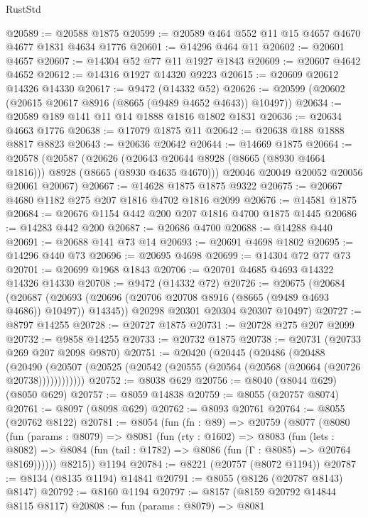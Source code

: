 \begin{lexlean}{RustStd}
\begin{coremodule}
@20589 := @20588 @1875
@20599 := @20589 @464 @552 @11 @15 @4657 @4670 @4677 @1831 @4634 @1776
@20601 := @14296 @464 @11
@20602 := @20601 @4657
@20607 := @14304 @52 @77 @11 @1927 @1843
@20609 := @20607 @4642 @4652
@20612 := @14316 @1927 @14320 @9223
@20615 := @20609 @20612 @14326 @14330
@20617 := @9472 (@14332 @52)
@20626 := @20599 (@20602 (@20615 @20617 @8916 (@8665 (@9489 @4652 @4643)) @10497))
@20634 := @20589 @189 @141 @11 @14 @1888 @1816 @1802 @1831
@20636 := @20634 @4663 @1776
@20638 := @17079 @1875 @11
@20642 := @20638 @188 @1888 @8817 @8823
@20643 := @20636 @20642
@20644 := @14669 @1875
@20664 := @20578
    (@20587
      (@20626 (@20643 @20644 @8928 (@8665 (@8930 @4664 @1816))) @8928 (@8665 (@8930 @4635 @4670)))
      @20046
      @20049
      @20052
      @20056
      @20061
      @20067)
@20667 := @14628 @1875 @1875 @9322
@20675 := @20667 @4680 @1182 @275 @207 @1816 @4702 @1816 @2099
@20676 := @14581 @1875
@20684 := @20676 @1154 @442 @200 @207 @1816 @4700 @1875 @1445
@20686 := @14283 @442 @200
@20687 := @20686 @4700
@20688 := @14288 @440
@20691 := @20688 @141 @73 @14
@20693 := @20691 @4698 @1802
@20695 := @14296 @440 @73
@20696 := @20695 @4698
@20699 := @14304 @72 @77 @73
@20701 := @20699 @1968 @1843
@20706 := @20701 @4685 @4693 @14322 @14326 @14330
@20708 := @9472 (@14332 @72)
@20726 := @20675
    (@20684
      (@20687 (@20693 (@20696 (@20706 @20708 @8916 (@8665 (@9489 @4693 @4686)) @10497)) @14345))
      @20298
      @20301
      @20304
      @20307
      @10497)
@20727 := @8797 @14255
@20728 := @20727 @1875
@20731 := @20728 @275 @207 @2099
@20732 := @9858 @14255
@20733 := @20732 @1875
@20738 := @20731 (@20733 @269 @207 @2098 @9870)
@20751 := @20420
    (@20445
      (@20486
        (@20488
          (@20490 (@20507 (@20525 (@20542 (@20555 (@20564 (@20568 (@20664 (@20726 @20738))))))))))))
@20752 := @8038 @629
@20756 := @8040 (@8044 @629) (@8050 @629)
@20757 := @8059 @14838
@20759 := @8055 (@20757 @8074)
@20761 := @8097 (@8098 @629)
@20762 := @8093 @20761
@20764 := @8055 (@20762 @8122)
@20781 := @8054
    (fun (fn : @89) =>
    @20759
      (@8077
        (@8080
          (fun (params : @8079) =>
          @8081
            (fun (rty : @1602) =>
            @8083
              (fun (lets : @8082) =>
              @8084 (fun (tail : @1782) => @8086 (fun (Γ : @8085) => @20764 @8169))))))
        @8215))
    @1194
@20784 := @8221 (@20757 (@8072 @1194))
@20787 := @8134 (@8135 @1194) @14841
@20791 := @8055 (@8126 (@20787 @8143) @8147)
@20792 := @8160 @1194
@20797 := @8157 (@8159 @20792 @14844 @8115 @8117)
@20808 := fun (params : @8079) =>
  @8081

\end{coremodule}
\end{lexlean}
